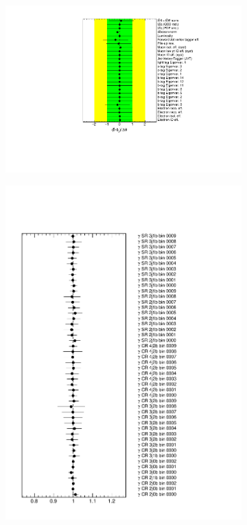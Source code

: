  
 \begin{figure}[!h] 
  \begin{subfigure}[b]{0.49\linewidth}
    \centering
    \includegraphics[width=1.24\textwidth]{ubonn-thesis/Chapters/Chapters_08/appendix/data/NuisPar.pdf}
    \caption{}
    \label{fig:newvpull}
  \end{subfigure}%
  \begin{subfigure}[b]{0.49\linewidth}
    \centering
    \includegraphics[width=1.1\textwidth]{ubonn-thesis/Chapters/Chapters_08/appendix/data/Gammas.pdf}

\end{subfigure}
\end{figure}
